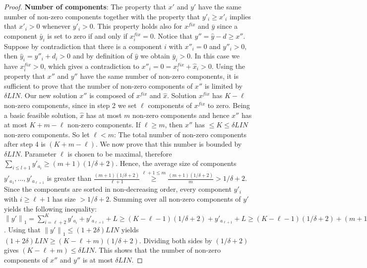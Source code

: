 \documentclass[a4paper,11pt]{article}
\newcommand{\nor}[1]{\left\|#1\right\|}
\begin{document}
\begin{proof}
	{\bf Number of components}: 
	The property that $x'$ and $y'$ have the same number of non-zero components together with the property that 
	$y'_i \geq x'_i$ implies that $x'_i >0$ whenever $y'_i > 0$.
	This property holds also for $x^{fix}$ and $\bar{y}$ since a component $\bar{y}_i$ is set to zero if and only if
	$x^{fix}_i =0$. Notice that $y'' = \hat{y} -d \geq x''$.
	Suppose by contradiction that there is a component $i$ with $x''_i = 0$ and $y''_i >0$, then $\hat{y}_i = y''_i +d_i >0$
	and by definition
	of $\hat{y}$ we obtain $\bar{y}_i>0$. In this case we have $x^{fix}_i >0$, which gives a contradiction
	to $x''_i = 0 = x^{fix}_i + \hat{x}_i >0$.
	Using the property that $x''$ and $y''$ have the same number of non-zero components, it is sufficient to prove
	that the number of non-zero components of $x''$ is limited by $\delta \mathit{LIN}$.
	Our new solution $x''$ is composed of $x^{fix}$ and $\hat{x}$. Solution $x^{fix}$ has $K-\ell$ non-zero
	components, since in step 2 we set $\ell$ components of $x^{fix}$ to zero. Being a basic feasible solution,
	$\hat{x}$ has at most $m$ non-zero components and hence $x''$ has at most $K+m-\ell$ non-zero components.
	If $\ell \geq m$, then $x''$ has $\leq K \leq \delta \mathit{LIN}$ non-zero components.
	So let $\ell < m$: The total number of non-zero components after step 4 is $(K+m- \ell)$. We now prove that
	this number is bounded by $\delta \mathit{LIN}$. 
	Parameter $\ell$ is chosen to be maximal, therefore $\sum_{i \leq l+1} y'_{a_i} \geq (m+1)(1/ \delta +2)$. 
	Hence, the average size of
	components $y'_{a_1}, \ldots, y'_{a_{\ell +1}}$ is greater than $\frac{(m+1)(1/ \delta +2)}{\ell+1} 
	\stackrel{\ell +1 \leq m}{\geq} 
	\frac{(m+1)(1/ \delta +2)}{m}> 1/ \delta +2$. Since the components are sorted in non-decreasing order, 
	every component $y'_i$
	with $i \geq \ell +1$ has size $> 1/ \delta +2$.
	Summing over all non-zero components of $y'$ yields the following inequality:
	$\nor{y'}_1 = \sum_{i= \ell +2}^K y'_{a_i} + y'_{a_{\ell +1}} + L \geq (K-\ell -1)(1 / \delta +2)+ y'_{a_{\ell +1}} +L 
	\geq (K- \ell-1 )(1 / \delta +2)+ (m+1)(1 / \delta +2) = (K-\ell+m)(1 / \delta +2)$.
	Using that $\nor{y'}_1 \leq (1+2 \delta)\mathit{LIN}$ yields
	$(1+2 \delta)\mathit{LIN} \geq (K- \ell +m)(1 / \delta +2)$.
	Dividing both sides by $(1 / \delta +2)$ gives $(K- \ell +m) \leq \delta \mathit{LIN}$. This shows
	that the number of non-zero components of $x''$ and $y''$ is at most $\delta \mathit{LIN}$.


\end{proof}
\end{document}
